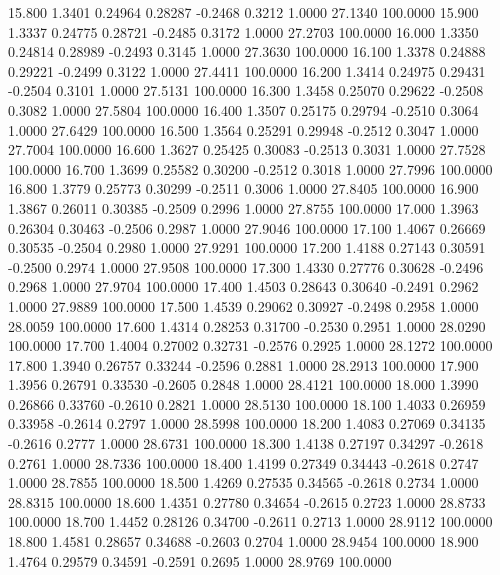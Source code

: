   15.800   1.3401   0.24964   0.28287  -0.2468   0.3212   1.0000  27.1340 100.0000
  15.900   1.3337   0.24775   0.28721  -0.2485   0.3172   1.0000  27.2703 100.0000
  16.000   1.3350   0.24814   0.28989  -0.2493   0.3145   1.0000  27.3630 100.0000
  16.100   1.3378   0.24888   0.29221  -0.2499   0.3122   1.0000  27.4411 100.0000
  16.200   1.3414   0.24975   0.29431  -0.2504   0.3101   1.0000  27.5131 100.0000
  16.300   1.3458   0.25070   0.29622  -0.2508   0.3082   1.0000  27.5804 100.0000
  16.400   1.3507   0.25175   0.29794  -0.2510   0.3064   1.0000  27.6429 100.0000
  16.500   1.3564   0.25291   0.29948  -0.2512   0.3047   1.0000  27.7004 100.0000
  16.600   1.3627   0.25425   0.30083  -0.2513   0.3031   1.0000  27.7528 100.0000
  16.700   1.3699   0.25582   0.30200  -0.2512   0.3018   1.0000  27.7996 100.0000
  16.800   1.3779   0.25773   0.30299  -0.2511   0.3006   1.0000  27.8405 100.0000
  16.900   1.3867   0.26011   0.30385  -0.2509   0.2996   1.0000  27.8755 100.0000
  17.000   1.3963   0.26304   0.30463  -0.2506   0.2987   1.0000  27.9046 100.0000
  17.100   1.4067   0.26669   0.30535  -0.2504   0.2980   1.0000  27.9291 100.0000
  17.200   1.4188   0.27143   0.30591  -0.2500   0.2974   1.0000  27.9508 100.0000
  17.300   1.4330   0.27776   0.30628  -0.2496   0.2968   1.0000  27.9704 100.0000
  17.400   1.4503   0.28643   0.30640  -0.2491   0.2962   1.0000  27.9889 100.0000
  17.500   1.4539   0.29062   0.30927  -0.2498   0.2958   1.0000  28.0059 100.0000
  17.600   1.4314   0.28253   0.31700  -0.2530   0.2951   1.0000  28.0290 100.0000
  17.700   1.4004   0.27002   0.32731  -0.2576   0.2925   1.0000  28.1272 100.0000
  17.800   1.3940   0.26757   0.33244  -0.2596   0.2881   1.0000  28.2913 100.0000
  17.900   1.3956   0.26791   0.33530  -0.2605   0.2848   1.0000  28.4121 100.0000
  18.000   1.3990   0.26866   0.33760  -0.2610   0.2821   1.0000  28.5130 100.0000
  18.100   1.4033   0.26959   0.33958  -0.2614   0.2797   1.0000  28.5998 100.0000
  18.200   1.4083   0.27069   0.34135  -0.2616   0.2777   1.0000  28.6731 100.0000
  18.300   1.4138   0.27197   0.34297  -0.2618   0.2761   1.0000  28.7336 100.0000
  18.400   1.4199   0.27349   0.34443  -0.2618   0.2747   1.0000  28.7855 100.0000
  18.500   1.4269   0.27535   0.34565  -0.2618   0.2734   1.0000  28.8315 100.0000
  18.600   1.4351   0.27780   0.34654  -0.2615   0.2723   1.0000  28.8733 100.0000
  18.700   1.4452   0.28126   0.34700  -0.2611   0.2713   1.0000  28.9112 100.0000
  18.800   1.4581   0.28657   0.34688  -0.2603   0.2704   1.0000  28.9454 100.0000
  18.900   1.4764   0.29579   0.34591  -0.2591   0.2695   1.0000  28.9769 100.0000
